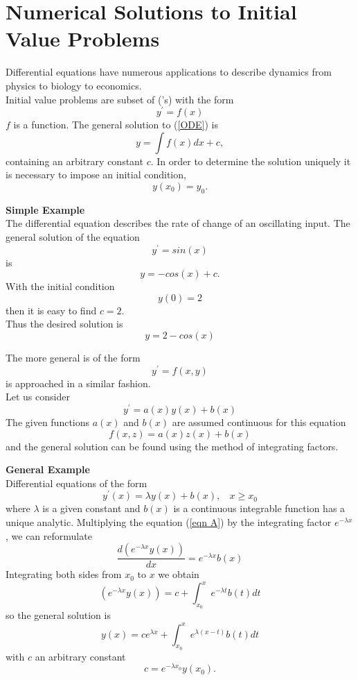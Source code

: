 \chapter{Numerical Solutions to Initial Value Problems}
Differential equations have numerous applications to describe dynamics from physics to biology to economics.\\

Initial value problems are subset of  ('s) with the form
\begin{equation}
\label{ODE}
y^{'}=f(x)
\end{equation}
$f$ is a function.  The general solution to (\ref{ODE})
is
\[
y=\int f(x)dx +c,
\]
 containing an arbitrary constant $c$.  In order to determine the solution uniquely it is necessary to impose an initial condition,
\begin{equation}
\label{Initial condition}
y(x_0)=y_0.
\end{equation}

\begin{example}
\textbf{Simple Example}\\
The differential equation describes the rate of change of an oscillating input. 
The general solution of the equation
\begin{equation}\label{ODE_sine} y^{'}=sin(x) \end{equation}
is 
\[ y=-cos(x)+c. \]
With the initial condition
\[y(0)=2\]
then it is easy to find $c=2$.\\
Thus the desired solution is
\[ y=2-cos(x) \]
\end{example}

The more general  is of the form
\begin{equation}
\label{general ODE}
y^{'}=f(x,y)
\end{equation}
is approached in a similar fashion.\\
Let us consider
\[ y^{'} = a(x)y(x)+b(x)\]
The given functions $a(x)$ and $b(x)$ are assumed continuous for this equation
\[f(x,z)=a(x)z(x)+b(x) \] 
and the general solution can be found using the method of integrating factors.
\begin{example}
\textbf{General Example}\\
Differential equations of the form
\begin{equation}
\label{eqn A}
y^{'}(x)=\lambda y(x) +b(x), \ \ \ \ x \geq x_0
\end{equation}
where  $\lambda$ is a given constant and $b(x)$ is a continuous integrable function has a unique analytic. Multiplying the equation (\ref{eqn A}) by the 
integrating factor $e^{-\lambda x}$, we can reformulate
\[\frac{d(e^{-\lambda x}y(x))}{dx}=e^{-\lambda x}b(x) \]
Integrating both sides from $x_0$ to $x$ we obtain
\[(e^{-\lambda x}y(x))=c+\int_{x_0}^{x}e^{-\lambda t}b(t)dt \]
so the general solution is
\[y(x)=ce^{\lambda x}+\int_{x_0}^{x}e^{\lambda(x-t)}b(t)dt \]
with $c$ an arbitrary constant
\[ c=e^{-\lambda x_0} y(x_0). \]
\end{example}

